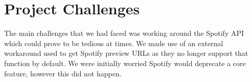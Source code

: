 \documentclass{article}
\begin{document}

\section{Project Challenges}
\quad The main challenges that we had faced was working around the Spotify API which could prove to be tedious at times.  We made use of an external workaround used to get Spotify preview URLs as they no longer support that function by default.  We were initially worried Spotify would deprecate a core feature, however this did not happen.


\end{document}
